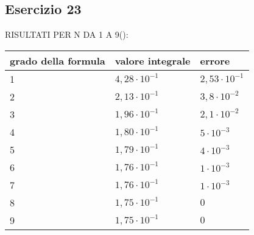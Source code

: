 \newpage
\subsection{Esercizio 23}


RISULTATI PER N DA 1 A 9():

\begin{table}[h]
    \begin{tabular}{|l |l |l|}
        \hline
        grado della formula & valore integrale   & errore\\
        \hline
        1                   & $4,28\cdot10^{-1}$ & $2,53\cdot10^{-1}$\\
        2                   & $2,13\cdot10^{-1}$ & $3,8\cdot10^{-2}$\\
        3                   & $1,96\cdot10^{-1}$ & $2,1\cdot10^{-2}$\\
        4                   & $1,80\cdot10^{-1}$ & $5\cdot10^{-3}$\\
        5                   & $1,79\cdot10^{-1}$ & $4\cdot10^{-3}$\\
        6                   & $1,76\cdot10^{-1}$ & $1\cdot10^{-3}$\\
        7                   & $1,76\cdot10^{-1}$ & $1\cdot10^{-3}$\\
        8                   & $1,75\cdot10^{-1}$ & $0$\\
        9                   & $1,75\cdot10^{-1}$ & $0$\\
        \hline
    \end{tabular}
\end{table}
   
